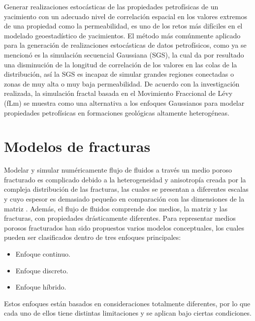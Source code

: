 Generar realizaciones estoc\'asticas de las propiedades petrof\'isicas de un yacimiento con un adecuado nivel de correlaci\'on espacial en los valores extremos de una propiedad como la permeabilidad, es uno de los retos m\'as dif\'iciles en el modelado geoestad\'istico de yacimientos. El m\'etodo m\'as com\'unmente aplicado para la generaci\'on de realizaciones estoc\'asticas de datos petrof\'isicos, como ya se mencion\'o es la simulaci\'on secuencial Gaussiana (SGS), la cual da por resultado una disminuci\'on de la longitud de correlaci\'on de los valores en las colas de la distribuci\'on, as\'i la SGS es incapaz de simular grandes regiones conectadas o zonas de muy alta o muy baja permeabilidad. De acuerdo con la investigaci\'on realizada, la simulaci\'on fractal basada en el Movimiento Fraccional de L\'evy (fLm) se muestra como una alternativa a los enfoques Gaussianos para modelar propiedades petrof\'isicas en formaciones geol\'ogicas altamente heterog\'eneas.

\section{Modelos de fracturas}


Modelar y simular num\'ericamente flujo de fluidos a trav\'es un medio poroso fracturado es complicado debido a la heterogeneidad y anisotrop\'ia creada por la compleja distribuci\'on de las fracturas, las cuales se presentan a diferentes escalas y cuyo espesor es demasiado peque\~no en comparaci\'on con las dimensiones de la matriz \citep{Romano2016}. Adem\'as, el flujo de fluidos comprende dos medios, la matriz y las fracturas, con propiedades dr\'asticamente diferentes. Para representar medios porosos fracturados han sido propuestos varios modelos conceptuales, los cuales pueden ser clasificados dentro de tres enfoques principales:

\begin{itemize}
	\item Enfoque continuo.
	\item Enfoque discreto.
	\item Enfoque h\'ibrido.
\end{itemize}

Estos enfoques est\'an basados en consideraciones totalmente diferentes, por lo que cada uno de ellos tiene distintas limitaciones y se aplican bajo ciertas condiciones.

